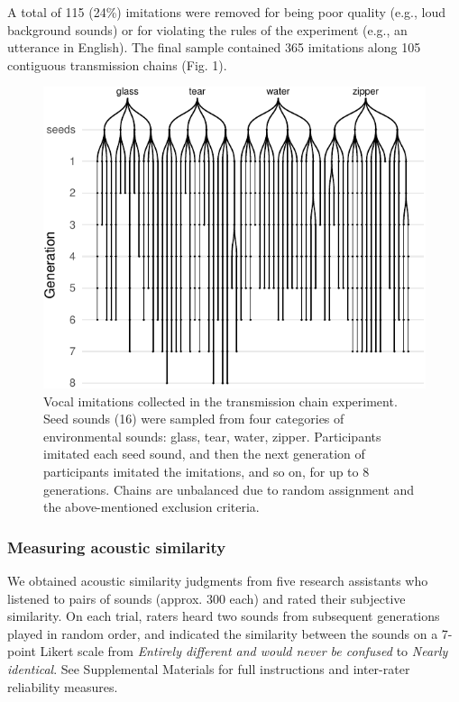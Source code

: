 \documentclass[english,floatsintext,man]{apa6}
\theoremstyle{definition}
\theoremstyle{definition}
\theoremstyle{definition}
\theoremstyle{remark}
\begin{document}
A total of 115 (24\%) imitations were removed for being poor quality
(e.g., loud background sounds) or for violating the rules of the
experiment (e.g., an utterance in English). The final sample contained
365 imitations along 105 contiguous transmission chains (Fig. 1).

\begin{figure}
\centering
\includegraphics{fig1-1.pdf}
\caption{\label{fig:fig1}Vocal imitations collected in the transmission
chain experiment. Seed sounds (16) were sampled from four categories of
environmental sounds: glass, tear, water, zipper. Participants imitated
each seed sound, and then the next generation of participants imitated
the imitations, and so on, for up to 8 generations. Chains are
unbalanced due to random assignment and the above-mentioned exclusion
criteria.}
\end{figure}

\hypertarget{measuring-acoustic-similarity}{%
\subsubsection{Measuring acoustic
similarity}\label{measuring-acoustic-similarity}}

We obtained acoustic similarity judgments from five research assistants
who listened to pairs of sounds (approx. 300 each) and rated their
subjective similarity. On each trial, raters heard two sounds from
subsequent generations played in random order, and indicated the
similarity between the sounds on a 7- point Likert scale from
\emph{Entirely different and would never be confused} to \emph{Nearly
identical}. See Supplemental Materials for full instructions and
inter-rater reliability measures.
\end{document}
